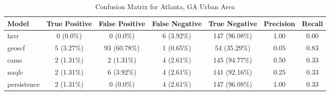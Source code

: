 \begin{table}[h!]
\centering
\begin{tabular}{lcccccc}
\hline
Model & True Positive & False Positive & False Negative & True Negative & Precision & Recall\\ \hline
hrrr & 0 (0.0\%) & 0 (0.0\%) & 6 (3.92\%) & 147 (96.08\%) & \cellcolor{green!25}1.00 & \cellcolor{red!25}0.00 \\ 
geoscf & 5 (3.27\%) & 93 (60.78\%) & 1 (0.65\%) & 54 (35.29\%) & \cellcolor{red!25}0.05 & \cellcolor{green!25}0.83 \\ 
cams & 2 (1.31\%) & 2 (1.31\%) & 4 (2.61\%) & 145 (94.77\%) & \cellcolor{red!25}0.50 & \cellcolor{green!25}0.33 \\ 
naqfc & 2 (1.31\%) & 6 (3.92\%) & 4 (2.61\%) & 141 (92.16\%) & \cellcolor{red!25}0.25 & \cellcolor{green!25}0.33 \\ 
persistence & 2 (1.31\%) & 0 (0.0\%) & 4 (2.61\%) & 147 (96.08\%) & 1.00 & 0.33 \\ 
\hline
\end{tabular}
\caption{Confusion Matrix for Atlanta, GA Urban Area}
\end{table}
